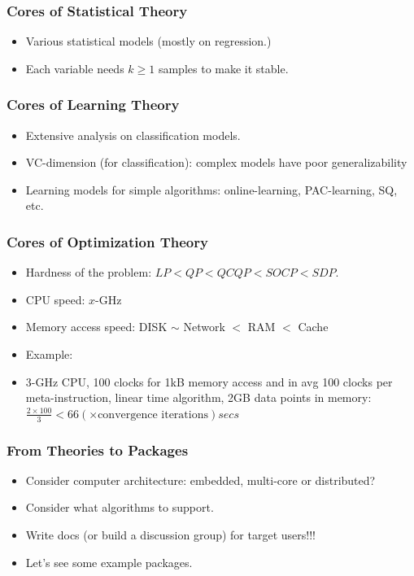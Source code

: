 \documentclass{beamer}
\begin{document}
\begin{frame}
  \frametitle{Cores of Statistical Theory}
  \begin{itemize}
    \item Various statistical models (mostly on regression.)
    \item Each variable needs $k \ge 1$ samples to make it stable.
  \end{itemize}
\end{frame} 

\begin{frame}
  \frametitle{Cores of Learning Theory}
  \begin{itemize}
    \item Extensive analysis on classification models.
    \item VC-dimension (for classification): complex models have poor generalizability
    \item Learning models for simple algorithms: online-learning, PAC-learning, SQ, etc.
  \end{itemize}
\end{frame} 

\begin{frame}
  \frametitle{Cores of Optimization Theory}
  \begin{itemize}
    \item Hardness of the problem: $LP < QP < QCQP < SOCP < SDP$.
    \item CPU speed: $x$-GHz
    \item Memory access speed: DISK $\sim$ Network $<$ RAM $<$ Cache
    \item Example:
    \item [] 3-GHz CPU, 100 clocks for 1kB memory access and in avg 100 clocks per meta-instruction, linear time algorithm, 2GB data points in memory: $\frac{2 \times 100}{3} < 66 (\times \text{convergence iterations}) secs$
  \end{itemize}
\end{frame} 

\begin{frame}
  \frametitle{From Theories to Packages}
  \begin{itemize}
    \item Consider computer architecture: embedded, multi-core or distributed?
    \item Consider what algorithms to support.
    \item Write docs (or build a discussion group) for target users!!!
    \pause 
    \item [] Let's see some example packages.
  \end{itemize}
\end{frame}
\end{document}
